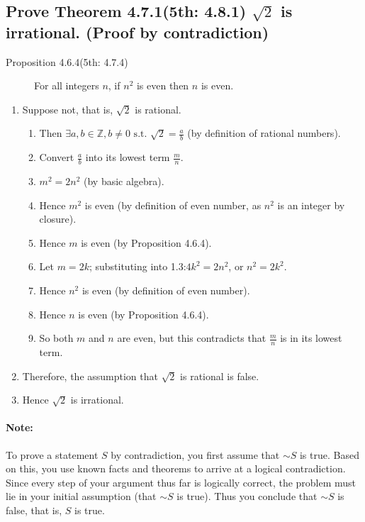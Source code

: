 \documentclass{article}
\begin{document}
\subsection*{Prove Theorem 4.7.1(5th: 4.8.1) $\sqrt{2}$ is irrational. (Proof by contradiction)}
\begin{description}
    \item[Proposition 4.6.4(5th: 4.7.4)] For all integers $n$, if $n^2$ is even then $n$ is even.
\end{description}
\begin{enumerate}
    \item Suppose not, that is, $\sqrt{2}$ is rational.
    \begin{enumerate}
        \item Then $\exists{a},b\in\mathbb{Z},b\neq0\text{ s.t. }\sqrt{2}=\frac{a}{b}$ (by definition of rational numbers).
        \item Convert $\frac{a}{b}$ into its lowest term $\frac{m}{n}$.
        \item $m^2=2n^2$ (by basic algebra).
        \item Hence $m^2$ is even (by definition of even number, as $n^2$ is an integer by closure).
        \item Hence $m$ is even (by Proposition 4.6.4).
        \item Let $m=2k$; substituting into 1.3:$4k^2=2n^2$, or $n^2=2k^2$.
        \item Hence $n^2$ is even (by definition of even number).
        \item Hence $n$ is even (by Proposition 4.6.4).
        \item So both $m$ and $n$ are even, but this contradicts that $\frac{m}{n}$ is in its lowest term.
    \end{enumerate}
    \item Therefore, the assumption that $\sqrt{2}$ is rational is false. 
    \item Hence $\sqrt{2}$ is irrational. 
\end{enumerate}
\paragraph{Note:}To prove a statement $S$ by contradiction, you first assume that ${\sim}{S}$ is true. Based on this, you use known facts and theorems to arrive at a logical contradiction. Since every step of your argument thus far is logically correct, the problem must lie in your initial assumption (that ${\sim}{S}$ is true). Thus you conclude that ${\sim}{S}$ is false, that is, $S$ is true.
\vspace{0.1cm}
\end{document}
